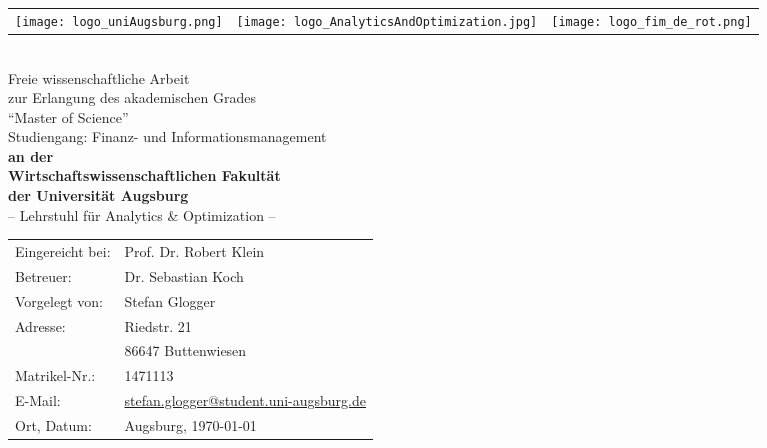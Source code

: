 \begin{titlepage}
\begin{spacing}{1.0}
	
\begin{tabularx}{\textwidth}{LYR}
	\texttt{[image: logo\_uniAugsburg.png]} &
	\texttt{[image: logo\_AnalyticsAndOptimization.jpg]} &
	\texttt{[image: logo\_fim\_de\_rot.png]}
\end{tabularx}
\vspace*{1.2cm}
\begin{center}
	{\huge \textbf{\Title\\}} 
\vspace*{1.2cm}
{\Large Freie wissenschaftliche Arbeit \\
zur Erlangung des akademischen Grades\\
\enquote{Master of Science}\\
Studiengang: Finanz- und Informationsmanagement\\
} 
\vspace*{.8cm}
{\Large \textbf{an der\\
Wirtschaftswissenschaftlichen Fakultät\\
der Universität Augsburg\\
}}
\vspace*{.8cm}
{\Large – Lehrstuhl für Analytics \& Optimization –\\}
\vspace*{.8cm}
{
\begin{tabular}{ll}
Eingereicht bei:& Prof. Dr. Robert Klein\\
Betreuer:& 			Dr. Sebastian Koch\\
Vorgelegt von:&	Stefan Glogger\\
Adresse:&			Riedstr. 21\\
&						86647 Buttenwiesen\\
Matrikel-Nr.:&		1471113\\
E-Mail:&				\href{mailto:stefan.glogger@student.uni-augsburg.de}{stefan.glogger@student.uni-augsburg.de}\\
Ort, Datum:&		Augsburg, \today \\
\end{tabular}
}
\end{center}

\end{spacing}

\end{titlepage}
